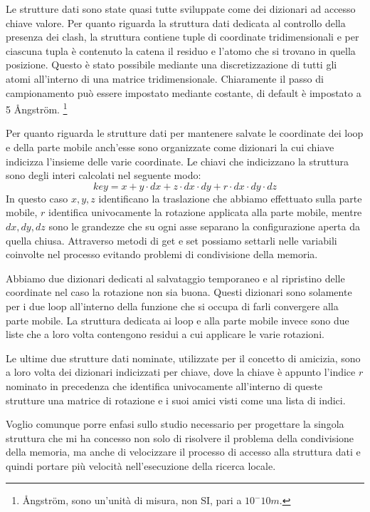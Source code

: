Le strutture dati sono state quasi tutte sviluppate come dei dizionari ad accesso chiave valore. Per quanto riguarda la struttura dati dedicata al controllo della presenza dei clash, la struttura contiene tuple di coordinate tridimensionali e per ciascuna tupla è contenuto la catena il residuo e l'atomo che si trovano in quella posizione. Questo è stato possibile mediante una discretizzazione di tutti gli atomi all'interno di una matrice tridimensionale. Chiaramente il passo di campionamento può essere impostato mediante costante, di default è impostato a 5 Ångström. \footnote{Ångström, sono un'unità di misura, non SI, pari a $10^-10m$.} 

Per quanto riguarda le strutture dati per mantenere salvate le coordinate dei loop e della parte mobile anch'esse sono organizzate come dizionari la cui chiave indicizza l'insieme delle varie coordinate. Le chiavi che indicizzano la struttura sono degli interi calcolati nel seguente modo:
$$
	key = x + y \cdot dx + z \cdot dx \cdot dy + r \cdot dx \cdot dy \cdot dz
$$
In questo caso $x, y, z$ identificano la traslazione che abbiamo effettuato sulla parte mobile, $r$ identifica univocamente la rotazione applicata alla parte mobile, mentre $dx, dy, dz$ sono le grandezze che su ogni asse separano la configurazione aperta da quella chiusa. Attraverso metodi di get e set possiamo settarli nelle variabili coinvolte nel processo evitando problemi di condivisione della memoria.

Abbiamo due dizionari dedicati al salvataggio temporaneo e al ripristino delle coordinate nel caso la rotazione non sia buona. Questi dizionari sono solamente per i due loop all'interno della funzione che si occupa di farli convergere alla parte mobile. La struttura dedicata ai loop e alla parte mobile invece sono due liste che a loro volta contengono residui a cui applicare le varie rotazioni. 

Le ultime due strutture dati nominate, utilizzate per il concetto di amicizia, sono a loro volta dei dizionari indicizzati per chiave, dove la chiave è appunto l'indice $r$ nominato in precedenza che identifica univocamente all'interno di queste strutture una matrice di rotazione e i suoi amici visti come una lista di indici.

Voglio comunque porre enfasi sullo studio necessario per progettare la singola struttura che mi ha concesso non solo di risolvere il problema della condivisione della memoria, ma anche di velocizzare il processo di accesso alla struttura dati e quindi portare più velocità nell'esecuzione della ricerca locale.

